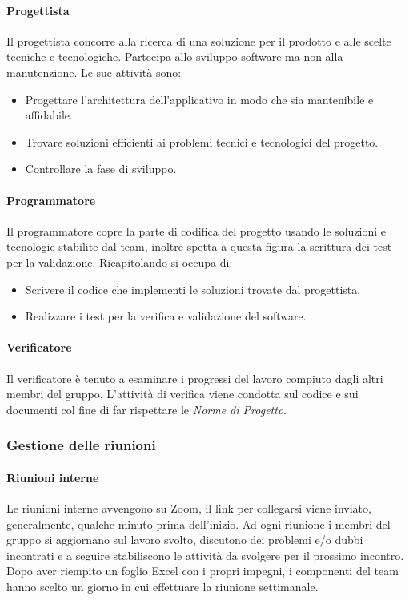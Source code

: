 \paragraph{Progettista} \hfill \break
Il progettista concorre alla ricerca di una soluzione per il prodotto e alle scelte tecniche e tecnologiche.
Partecipa allo sviluppo software ma non alla manutenzione. Le sue attività sono:
\begin{itemize}
    \item Progettare l'architettura dell'applicativo in modo che sia mantenibile e affidabile.
    \item Trovare soluzioni efficienti ai problemi tecnici e tecnologici del progetto.
    \item Controllare la fase di sviluppo.
\end{itemize}

\paragraph{Programmatore} \hfill \break
Il programmatore copre la parte di codifica del progetto usando le soluzioni e tecnologie stabilite dal team, inoltre
spetta a questa figura la scrittura dei test per la validazione. Ricapitolando si occupa di:
\begin{itemize}
    \item Scrivere il codice che implementi le soluzioni trovate dal progettista.
    \item Realizzare i test per la verifica e validazione del software.
\end{itemize}

\paragraph{Verificatore} \hfill \break
Il verificatore è tenuto a esaminare i progressi del lavoro compiuto dagli altri membri del gruppo.   
L'attività di verifica viene condotta sul codice e sui documenti col fine di far rispettare le \emph{Norme di Progetto}.

\subsubsection{Gestione delle riunioni}
\paragraph{Riunioni interne} \hfill \break
Le riunioni interne avvengono su Zoom, il link per collegarsi viene inviato, generalmente, 
qualche minuto prima dell'inizio. Ad ogni riunione i membri del gruppo si aggiornano sul lavoro svolto, discutono dei problemi e/o dubbi incontrati 
e a seguire stabiliscono le attività da svolgere per il prossimo incontro. Dopo aver riempito un foglio Excel con i propri impegni, 
i componenti del team hanno scelto un giorno in cui effettuare la riunione settimanale.

